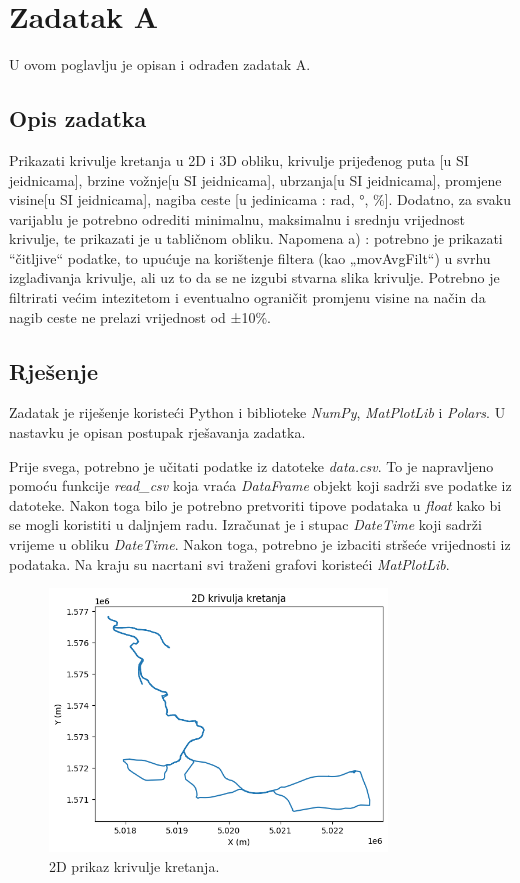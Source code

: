 \chapter{Zadatak A} \label{ch:a}
U ovom poglavlju je opisan i odrađen zadatak A.

\section{Opis zadatka} \label{sec:a:opis}
Prikazati krivulje kretanja u 2D i 3D obliku, krivulje prijeđenog puta [u SI jeidnicama], brzine vožnje[u
SI jeidnicama], ubrzanja[u SI jeidnicama], promjene visine[u SI jeidnicama], nagiba ceste [u
jedinicama : rad, °, \%]. Dodatno, za svaku varijablu je potrebno odrediti minimalnu, maksimalnu i
srednju vrijednost krivulje, te prikazati je u tabličnom obliku.
Napomena a) : potrebno je prikazati “čitljive“ podatke, to upućuje na korištenje filtera (kao
„movAvgFilt“) u svrhu izglađivanja krivulje, ali uz to da se ne izgubi stvarna slika krivulje. Potrebno
je filtrirati većim intezitetom i eventualno ograničit promjenu visine na način da nagib ceste ne
prelazi vrijednost od ±10\%.

\section{Rješenje} \label{sec:a:rjesenje} Zadatak je riješenje koristeći Python
i biblioteke \textit{NumPy}, \textit{MatPlotLib} i \textit{Polars}. U nastavku je opisan postupak
rješavanja zadatka.

Prije svega, potrebno je učitati podatke iz datoteke \textit{data.csv}. To je
napravljeno pomoću funkcije \textit{read\_csv} koja vraća \textit{DataFrame} objekt koji
sadrži sve podatke iz datoteke. Nakon toga bilo je potrebno pretvoriti tipove
podataka u \textit{float} kako bi se mogli koristiti u daljnjem radu. Izračunat je i
stupac \textit{DateTime} koji sadrži vrijeme u obliku \textit{DateTime}. Nakon toga,
potrebno je izbaciti stršeće vrijednosti iz podataka. Na kraju su nacrtani
svi traženi grafovi koristeći \textit{MatPlotLib}.

\begin{figure}
    \centering
    \includegraphics[width=0.8\textwidth]{images/path_2d.png}
    \caption{2D prikaz krivulje kretanja.}
    \label{fig:a:2d}
\end{figure}

